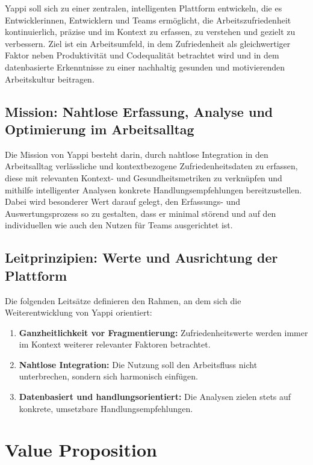 \documentclass[12pt,a4paper]{report}
\begin{document}
Yappi soll sich zu einer zentralen, intelligenten Plattform entwickeln, die es Entwicklerinnen, Entwicklern und Teams ermöglicht,
die Arbeitszufriedenheit kontinuierlich, präzise und im Kontext zu erfassen, zu verstehen und gezielt zu verbessern. Ziel ist ein
Arbeitsumfeld, in dem Zufriedenheit als gleichwertiger Faktor neben Produktivität und Codequalität betrachtet wird und in dem
datenbasierte Erkenntnisse zu einer nachhaltig gesunden und motivierenden Arbeitskultur beitragen.

\subsection{Mission: Nahtlose Erfassung, Analyse und Optimierung im Arbeitsalltag}

Die Mission von Yappi besteht darin, durch nahtlose Integration in den Arbeitsalltag verlässliche und kontextbezogene
Zufriedenheitsdaten zu erfassen, diese mit relevanten Kontext- und Gesundheitsmetriken zu verknüpfen und mithilfe intelligenter
Analysen konkrete Handlungsempfehlungen bereitzustellen. Dabei wird besonderer Wert darauf gelegt, den Erfassungs- und
Auswertungsprozess so zu gestalten, dass er minimal störend und auf den individuellen wie auch den Nutzen für Teams ausgerichtet
ist.

\subsection{Leitprinzipien: Werte und Ausrichtung der Plattform}

Die folgenden Leitsätze definieren den Rahmen, an dem sich die Weiterentwicklung von Yappi orientiert:

\begin{enumerate}
  \item \textbf{Ganzheitlichkeit vor Fragmentierung:} Zufriedenheitswerte werden immer im Kontext weiterer relevanter Faktoren 
    betrachtet.
  \item \textbf{Nahtlose Integration:} Die Nutzung soll den Arbeitsfluss nicht unterbrechen, sondern sich harmonisch einfügen.
  \item \textbf{Datenbasiert und handlungsorientiert:} Die Analysen zielen stets auf konkrete, umsetzbare Handlungsempfehlungen.
\end{enumerate}

\section{Value Proposition}
\end{document}
